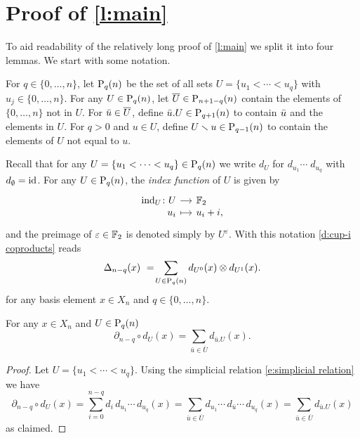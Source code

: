 
\section{Proof of \cref{l:main}} \label{s:proof}

To aid readability of the relatively long proof of \cref{l:main} we split it into four lemmas.
We start with some notation.

\begin{definition}
	For $q \in \{0, \dots, n\}$, let $\P_q(n)$ be the set of all sets $U = \{u_1 < \cdots < u_q\}$ with $u_j \in \{0, \dots, n\}$.
	For any $U \in \P_q(n)$, let $\overline{U} \in \P_{n+1-q}(n)$ contain the elements of $\{0, \dots, n\}$ not in $U$. For $\bu \in \overline{U}$, define $\bu.U \in \P_{q+1}(n)$ to contain $\bu$ and the elements in $U$.
	For $q > 0$ and $u \in U$, define $U \sm u \in \P_{q-1}(n)$ to contain the elements of $U$ not equal to $u$.
\end{definition}

Recall that for any $U = \{u_1 < \cdots < u_q\} \in \P_q(n)$ we write $d_U$ for $d_{u_1} \cdots \; d_{u_q}$ with $d_{\emptyset} = \id$.
For any $U \in \P_q(n)$, the \textit{index function} of $U$ is given by
\begin{equation*}
\begin{tikzcd}[row sep=-3pt, column sep=small,
/tikz/column 1/.append style={anchor=base east},
/tikz/column 2/.append style={anchor=base west}]
\ind_U \colon U \arrow[r] & \F_2 \\
u_i \arrow[r, mapsto] & u_i + i,
\end{tikzcd}
\end{equation*}
and the preimage of $\varepsilon \in \F_2$ is denoted simply by $U^\varepsilon$.
With this notation \cref{d:cup-i coproducts} reads
\begin{equation*}
\Delta_{n-q}(x)\ =\! \sum_{U \in \P_q(n)} d_{U^0}(x) \otimes d_{U^1}(x).
\end{equation*}
for any basis element $x \in X_n$ and $q \in \{0, \dots, n\}$.

\begin{lemma} \label{l:partial dU = dxU}
	For any $x \in X_n$ and $U \in \P_{q}(n)$
	\begin{equation} \label{lemma1: existence:eq1}
	\partial_{n-q} \circ d_U(x) = \sum_{\bar{u} \in \overline{U}} d_{\bar{u}.U}(x).
	\end{equation}
\end{lemma}

\begin{proof}
	Let $U = \{u_1 < \cdots < u_q\}$. Using the simplicial relation \eqref{e:simplicial relation} we have
	\begin{equation*}
	\partial_{n-q} \circ d_U(x) = 
	\sum_{i=0}^{n-q} d_i\, d_{u_1} \cdots\, d_{u_q}(x) = 
	\sum_{\bar{u} \in \overline{U}} d_{u_1} \cdots\, d_{\bar{u}} \cdots\, d_{u_q}(x) =
	\sum_{\bar{u} \in \overline{U}} d_{\bar{u}.U}(x)
	\end{equation*}
	as claimed.
\end{proof}

